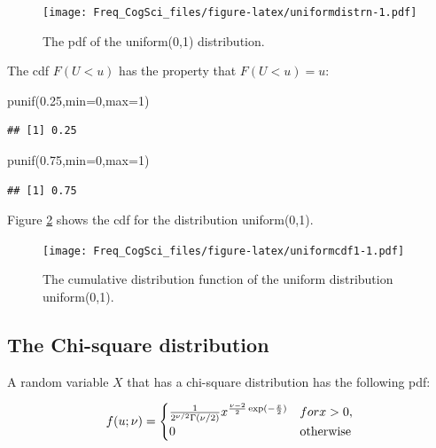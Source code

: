 \documentclass[
  12pt,
]{krantz}
\newenvironment{Shaded}{\begin{snugshade}}{\end{snugshade}}
\newcommand{\AttributeTok}[1]{\textcolor[rgb]{0.77,0.63,0.00}{#1}}
\newcommand{\DecValTok}[1]{\textcolor[rgb]{0.00,0.00,0.81}{#1}}
\newcommand{\FloatTok}[1]{\textcolor[rgb]{0.00,0.00,0.81}{#1}}
\newcommand{\FunctionTok}[1]{\textcolor[rgb]{0.00,0.00,0.00}{#1}}
\newcommand{\NormalTok}[1]{#1}
\theoremstyle{definition}
\theoremstyle{definition}
\theoremstyle{definition}
\theoremstyle{definition}
\theoremstyle{remark}
\begin{document}
\begin{figure}
\centering
\texttt{[image: Freq\_CogSci\_files/figure-latex/uniformdistrn-1.pdf]}
\caption{\label{fig:uniformdistrn}The pdf of the uniform(0,1) distribution.}
\end{figure}

The cdf \(F(U<u)\) has the property that \(F(U<u)=u\):

\begin{Shaded}
\begin{Highlighting}[]
\FunctionTok{punif}\NormalTok{(}\FloatTok{0.25}\NormalTok{,}\AttributeTok{min=}\DecValTok{0}\NormalTok{,}\AttributeTok{max=}\DecValTok{1}\NormalTok{)}
\end{Highlighting}
\end{Shaded}

\begin{verbatim}
## [1] 0.25
\end{verbatim}

\begin{Shaded}
\begin{Highlighting}[]
\FunctionTok{punif}\NormalTok{(}\FloatTok{0.75}\NormalTok{,}\AttributeTok{min=}\DecValTok{0}\NormalTok{,}\AttributeTok{max=}\DecValTok{1}\NormalTok{)}
\end{Highlighting}
\end{Shaded}

\begin{verbatim}
## [1] 0.75
\end{verbatim}

Figure \ref{fig:uniformcdf1} shows the cdf for the distribution uniform(0,1).

\begin{figure}
\centering
\texttt{[image: Freq\_CogSci\_files/figure-latex/uniformcdf1-1.pdf]}
\caption{\label{fig:uniformcdf1}The cumulative distribution function of the uniform distribution uniform(0,1).}
\end{figure}

\hypertarget{the-chi-square-distribution}{%
\subsection{The Chi-square distribution}\label{the-chi-square-distribution}}

A random variable \(X\) that has a chi-square distribution has the following pdf:

\begin{equation}
f(u; \nu)=
\begin{cases}
\frac{1}{2^{\nu/2} \Gamma(\nu/2)}x^{\frac{\nu-2}{2}\exp(-\frac{x}{2})} &  for x>0 ,\\
0 & \hbox{otherwise}
\end{cases}
\end{equation}
\end{document}
